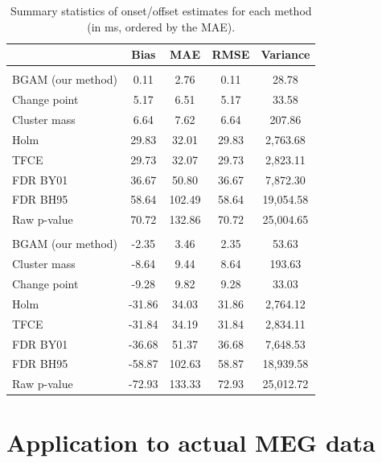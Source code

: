 \documentclass[
  doc,
  floatsintext,
  longtable,
  a4paper,
  nolmodern,
  notxfonts,
  notimes,
  colorlinks=true,linkcolor=blue,citecolor=blue,urlcolor=blue]{apa7}
\begin{document}
\begin{table}

{\caption{{Summary statistics of onset/offset estimates for each method
(in ms, ordered by the MAE).}{\label{tbl-simulation-results}}}}

\fontsize{9.0pt}{10.8pt}\selectfont
\begin{tabular*}{\linewidth}{@{\extracolsep{\fill}}lcccc}
\toprule
 & Bias & MAE & RMSE & Variance \\ 
\midrule\addlinespace[2.5pt]
\multicolumn{5}{l}{onset} \\[2.5pt] 
\midrule\addlinespace[2.5pt]
BGAM (our method) & 0.11 & 2.76 & 0.11 & 28.78 \\ 
Change point & 5.17 & 6.51 & 5.17 & 33.58 \\ 
Cluster mass & 6.64 & 7.62 & 6.64 & 207.86 \\ 
Holm & 29.83 & 32.01 & 29.83 & 2,763.68 \\ 
TFCE & 29.73 & 32.07 & 29.73 & 2,823.11 \\ 
FDR BY01 & 36.67 & 50.80 & 36.67 & 7,872.30 \\ 
FDR BH95 & 58.64 & 102.49 & 58.64 & 19,054.58 \\ 
Raw p-value & 70.72 & 132.86 & 70.72 & 25,004.65 \\ 
\midrule\addlinespace[2.5pt]
\multicolumn{5}{l}{offset} \\[2.5pt] 
\midrule\addlinespace[2.5pt]
BGAM (our method) & -2.35 & 3.46 & 2.35 & 53.63 \\ 
Cluster mass & -8.64 & 9.44 & 8.64 & 193.63 \\ 
Change point & -9.28 & 9.82 & 9.28 & 33.03 \\ 
Holm & -31.86 & 34.03 & 31.86 & 2,764.12 \\ 
TFCE & -31.84 & 34.19 & 31.84 & 2,834.11 \\ 
FDR BY01 & -36.68 & 51.37 & 36.68 & 7,648.53 \\ 
FDR BH95 & -58.87 & 102.63 & 58.87 & 18,939.58 \\ 
Raw p-value & -72.93 & 133.33 & 72.93 & 25,012.72 \\ 
\bottomrule
\end{tabular*}

\end{table}

\section{Application to actual MEG
data}\label{application-to-actual-meg-data}
\end{document}
